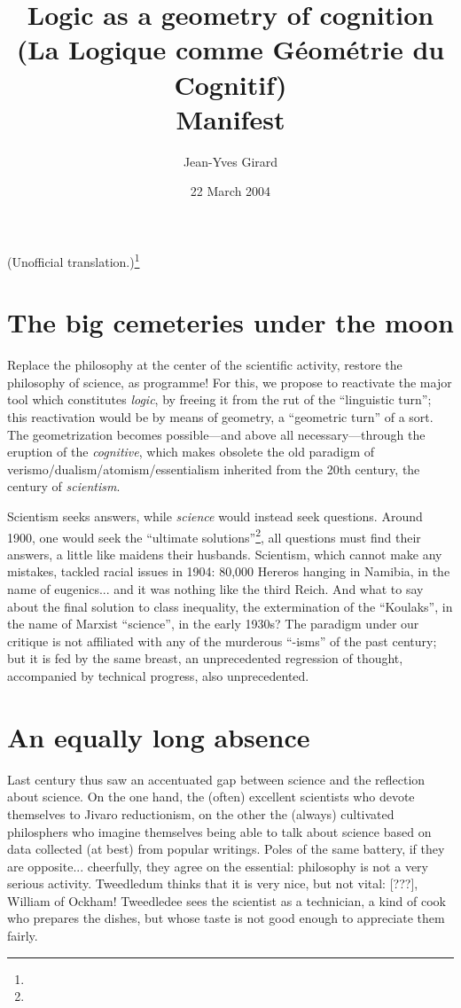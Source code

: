 \documentclass{article}
\author{Jean-Yves Girard}
\title{Logic as a geometry of cognition \\ (La Logique comme Géométrie du Cognitif) \\ Manifest}
\date{22 March 2004}
\begin{document}
\maketitle
\noindent
(Unofficial translation.)\footnote{}

\section{The big cemeteries under the moon}
Replace the philosophy at the center of the scientific activity, restore the philosophy of science, as programme! For this, we propose to reactivate the major tool which constitutes \emph{logic}, by freeing it from the rut of the \enquote{linguistic turn}; this reactivation would be by means of geometry, a \enquote{geometric turn} of a sort. The geometrization becomes possible---and above all necessary---through the eruption of the \emph{cognitive}, which makes obsolete the old paradigm of verismo/dualism/atomism/essentialism inherited from the 20th century, the century of \emph{scientism}.

Scientism seeks answers, while \emph{science} would instead seek questions. Around 1900, one would seek the \enquote{ultimate solutions}\footnote{}, all questions must find their answers, a little like maidens their husbands. Scientism, which cannot make any mistakes, tackled racial issues in 1904: 80,000 Hereros hanging in Namibia, in the name of eugenics... and it was nothing like the third Reich. And what to say about the final solution to class inequality, the extermination of the \enquote{Koulaks}, in the name of Marxist \enquote{science}, in the early 1930s? The paradigm under our critique is not affiliated with any of the murderous \enquote{-isms} of the past century; but it is fed by the same breast, an unprecedented regression of thought, accompanied by technical progress, also unprecedented.

\section{An equally long absence}
Last century thus saw an accentuated gap between science and the reflection about science. On the one hand, the (often) excellent scientists who devote themselves to Jivaro reductionism, on the other the (always) cultivated philosphers who imagine themselves being able to talk about science based on data collected (at best) from popular writings. Poles of the same battery, if they are opposite... cheerfully, they agree on the essential: philosophy is not a very serious activity. Tweedledum thinks that it is very nice, but not vital: [???], William of Ockham! Tweedledee sees the scientist as a technician, a kind of cook who prepares the dishes, but whose taste is not good enough to appreciate them fairly.
\end{document}
